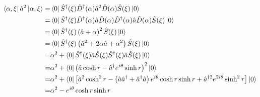 \documentclass[twoside]{article}
\begin{document}
\begin{equation*}
    \begin{split}
        \bra{\alpha, \xi } \hat{a}^2 \ket{\alpha , \xi} = & \bra{0} \hat{S}^\dagger (\xi) \hat{D}^\dagger (\alpha)  \hat{a}^2 \hat{D}(\alpha) \hat{S} (\xi) \ket{0}                                                                                                 \\
        =                                                 & \bra{0} \hat{S}^\dagger (\xi) \hat{D}^\dagger (\alpha)  \hat{a} \hat{D} (\alpha) \hat{D}^\dagger (\alpha) \hat{a} \hat{D}(\alpha) \hat{S} (\xi) \ket{0}                                                 \\
        =                                                 & \bra{0} \hat{S}^\dagger (\xi) \left(\hat{a} + \alpha\right)^2\hat{S} (\xi) \ket{0}                                                                                                                      \\
        =                                                 & \bra{0} \hat{S}^\dagger (\xi) \left(\hat{a}^2 + 2\alpha \hat{a} + \alpha^2\right) \hat{S} (\xi) \ket{0}                                                                                                 \\
        =                                                 & \alpha^2 + \bra{0} \hat{S}^\dagger (\xi) \hat{a} \hat{S} (\xi) \hat{S}^\dagger (\xi) \hat{a} \hat{S} (\xi) \ket{0}                                                                                      \\
        =                                                 & \alpha^2 + \bra{0} \left(\hat{a} \cosh r - \hat{a}^\dagger e^{i\theta} \sinh r\right)^2  \ket{0}                                                                                                        \\
        =                                                 & \alpha^2 + \bra{0} \left[\hat{a}^2 \cosh^2 r - \left(\hat{a} \hat{a}^\dagger + \hat{a}^\dagger \hat{a}\right) e^{i\theta} \cosh r \sinh r  + \hat{a}^{\dagger 2} e^{2i\theta} \sinh^2 r\right]  \ket{0} \\
        =                                                 & \alpha^2 - e^{i\theta} \cosh r \sinh r
    \end{split}
\end{equation*}
\end{document}
